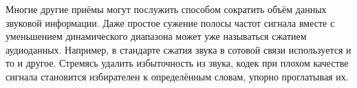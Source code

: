 \documentclass[a4paper]{report}
\begin{document}
Многие другие приёмы могут послужить способом сократить объём данных звуковой информации. Даже простое сужение полосы частот сигнала вместе с уменьшением динамического диапазона может уже называться сжатием аудиоданных. Например, в стандарте сжатия звука в сотовой связи используется и то и другое. Стремясь удалить избыточность из звука, кодек при плохом качестве сигнала становится избирателен к определённым словам, упорно проглатывая их. 
\end{document}
